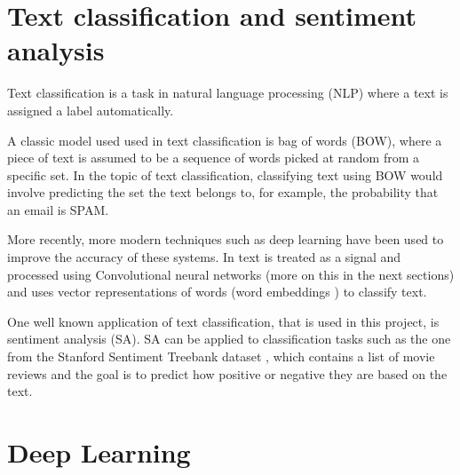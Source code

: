 \section{Text classification and sentiment analysis}

Text classification is a task in natural language processing \cite{chowdhury2003natural} (NLP) where a text is assigned a label automatically.

A classic model used used in text classification is bag of words \cite{wallach2006topic} (BOW), where a piece of text is assumed to be a sequence of words picked at random from a specific set. In the topic of text classification, classifying text using BOW would involve predicting the set the text belongs to, for example, the probability that an email is SPAM.

More recently, more modern techniques such as deep learning have been used to improve the accuracy of these systems. In \cite{zhang2015character} text is treated as a signal and processed using Convolutional neural networks (more on this in the next sections) and \cite{DBLP:journals/corr/Kim14f} uses vector representations of words (word embeddings \cite{goldberg2014word2vec}) to classify text.

One well known application of text classification, that is used in this project, is sentiment analysis (SA). SA can be applied to classification tasks such as the one from the Stanford Sentiment Treebank dataset \cite{socher2013recursive}, which contains a list of movie reviews and the goal is to predict how positive or negative they are based on the text.


\section{Deep Learning} \label{sec:dnn}

